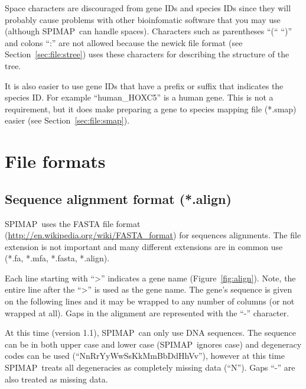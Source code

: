 \documentclass[11pt]{article}
\newcommand{\figref}[1]{Figure~\ref{#1}}
\newcommand{\secref}[1]{Section~\ref{#1}}
\newcommand{\spimap}{{\sf\scshape SPIMAP}}
\begin{document}
Space characters are discouraged from gene IDs and species IDs since
they will probably cause problems with other bioinfomatic software
that you may use (although \spimap\ can handle spaces).  Characters
such as parentheses ``(`` ``)'' and colons ``:'' are not allowed
because the newick file format (see \secref{sec:file:stree}) uses these
characters for describing the structure of the tree.

It is also easier to use gene IDs that have a prefix or suffix that indicates
the species ID.  For example ``human\_HOXC5'' is a human gene.  This is not
a requirement, but it does make preparing a gene to species mapping 
file (*.smap) easier (see \secref{sec:file:smap}).



\section{File formats}

\subsection{Sequence alignment format (*.align)}

\spimap\ uses the FASTA file format
(\url{http://en.wikipedia.org/wiki/FASTA\_format}) for sequences
alignments.  The file extension is not important and many different 
extensions are in common use (*.fa, *.mfa, *.fasta, *.align).

Each line starting with ``>'' indicates a gene name
(\figref{fig:align}).  Note, the entire line after the ``>'' is used as the
gene name.  The gene's sequence is given on the following
lines and it may be wrapped to any number of columns (or not wrapped at
all).  Gaps in the alignment are represented with the ``-'' character.

At this time (version 1.1), \spimap\ can only use DNA sequences.  The
sequence can be in both upper case and lower case (\spimap\ ignores
case) and degeneracy codes can be used (``NnRrYyWwSsKkMmBbDdHhVv''),
however at this time \spimap\ treats all degeneracies as completely
missing data (``N'').  Gaps ``-'' are also treated as missing data.
\end{document}
